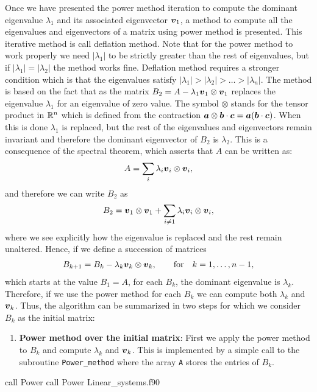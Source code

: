      Once we have presented the power method iteration to compute the dominant eigenvalue $\lambda_1$ and its associated eigenvector $\boldsymbol{v}_1$, a method to compute all the eigenvalues and eigenvectors of a matrix using power method is presented. This iterative method is call deflation method. Note that for the power method to work properly we need $|\lambda_1|$ to be strictly greater than the rest of eigenvalues, but if $|\lambda_1|=|\lambda_2|$ the method works fine. Deflation method requires a stronger condition which is that the eigenvalues satisfy $|\lambda_1|>|\lambda_2|>\dots>|\lambda_n|$.
     The method is based on the fact that as the matrix $B_2= A-\lambda_1 \boldsymbol{v}_1 \otimes \boldsymbol{v}_1 $ replaces the eigenvalue $\lambda_1$ for an eigenvalue of zero value. The symbol $\otimes$ stands for the tensor product in $\mathbb{R}^{n}$ which is defined from the contraction $\boldsymbol{a}\otimes\boldsymbol{b}\cdot \boldsymbol{c}=\boldsymbol{a}(\boldsymbol{b}\cdot \boldsymbol{c})$. When this is done $\lambda_1$ is replaced, but the rest of the eigenvalues and eigenvectors remain invariant and therefore the dominant eigenvector of $B_2$ is $\lambda_2$. This is a consequence of the spectral theorem, which asserts that $A$ can be written as:
     \begin{align}
     	A = \sum_{i} \lambda_i \boldsymbol{v}_i \otimes\boldsymbol{v}_i,
     \end{align}
     and therefore we can write $B_2$ as
     \begin{align}
     	B_2 = \boldsymbol{v}_1 \otimes\boldsymbol{v}_1
     	+\sum_{i\neq 1} \lambda_i \boldsymbol{v}_i \otimes\boldsymbol{v}_i,
     \end{align}
     where we see explicitly how the eigenvalue is replaced and the rest remain unaltered. Hence, if we define a succession of matrices 
     \begin{align}
     	B_{k+1} = B_{k} - \lambda_k \boldsymbol{v}_k\otimes\boldsymbol{v}_k,
     	\qquad
     	\mbox{for}
     	\quad k=1,\ldots, n-1,
     	\label{eq:Deflation_Matrix}
     \end{align}
     which starts at the value $B_1=A$, for each $B_k$, the dominant eigenvalue is $\lambda_{k}$. Therefore, if we use the power method for each $B_k$ we can compute both $\lambda_{k}$ and $\boldsymbol{v}_{k}$. Thus, the algorithm can be summarized in two steps for which we consider $B_k$ as the initial matrix:
     
     \begin{enumerate}
     	\item \textbf{Power method over the initial matrix}: First we apply the power method to $B_k$ and compute $\lambda_{k}$ and $\boldsymbol{v}_{k}$. This is implemented by a simple call to the subroutine \verb|Power_method| where the array \verb|A| stores the entries of $B_k$.    	
     \end{enumerate}
     \vspace{0.5cm} 
     {call Power}
     {call Power}
     {Linear_systems.f90}
     
